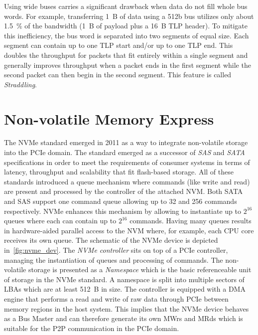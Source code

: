 Using wide buses carries a significant drawback when data do not fill whole bus words. For example,
transferring 1~B of data using a 512b bus utilizes only about 1.5~\% of the bandwidth (1~B of
payload plus a 16~B TLP header). To mitigate this inefficiency, the bus word is separated into two
segments of equal size. Each segment can contain up to one TLP start and/or up to one TLP end. This
doubles the throughput for packets that fit entirely within a single segment and generally improves
throughput when a packet ends in the first segment while the second packet can then begin in the
second segment. This feature is called \emph{Straddling}\cite{pcie_amd_ip}.

\chapter{Non-volatile Memory Express}
\label{chap:nvme_desc}

The \ac{NVMe} standard emerged in 2011 as a way to integrate non-volatile storage into the
\ac{PCIe} domain\footnotemark. The standard emerged as a successor of \emph{SAS} and \emph{SATA}
specifications in order to meet the requirements of consumer systems in terms of latency, throughput
and scalability that fit flash-based storage. All of these standards introduced a queue
mechanism where commands (like write and read) are present and processed by the controller of the
attached \ac{NVM}. Both SATA and SAS support one command queue allowing up to 32 and 256 commands
respectively. NVMe enhances this mechanism by allowing to instantiate up to $2^{16}$ queues where
each can contain up to $2^{16}$ commands\cite{nvme_overview}. Having many queues results
in hardware-aided parallel access to the \ac{NVM} where, for example, each CPU core receives its own
queue. The schematic of the NVMe device is depicted in~\cref{fig:nvme_dev}. The \emph{NVMe controller}
sits on top of a PCIe controller, managing the instantiation of queues and processing of commands.
The non-volatile storage is presented as a \emph{Namespace} which is the basic referenceable unit of
storage in the NVMe standard\footnotemark. A namespace is split into multiple sectors of \acp{LBA}
which are at least 512~B in size. The controller is equipped with a DMA engine that performs a read
and write of raw data through PCIe between memory regions in the host system. This implies that the
NVMe device behaves as a Bus Master and can therefore generate its own \acp{MWr} and \acp{MRd} which
is suitable for the \ac{P2P} communication in the PCIe domain.

